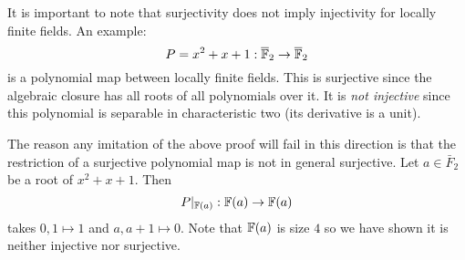 It is important to note that surjectivity does not imply
injectivity for locally finite fields.
An example:
\[ P = x^{2} + x + 1 : \overline{\mathbb{F}}_{2} \to \overline{\mathbb{F}}_{2}\]
is a polynomial map between locally finite fields.
This is surjective since the algebraic closure has all
roots of all polynomials over it.
It is \textit{not injective} since this polynomial is
separable in characteristic two (its derivative is a unit).

The reason any imitation of the above proof will fail
in this direction is that the restriction of a surjective polynomial map
is not in general surjective.
Let $a \in \bar{F}_{2}$ be a root of $x^{2} + x + 1$. Then
\[ P |_{\mathbb{F}(a)} : \mathbb{F}(a) \to \mathbb{F}(a) \]
takes $0,1 \mapsto 1$ and $a, a + 1 \mapsto 0$.
Note that $\mathbb{F}(a)$ is size $4$ so we have shown it is
neither injective nor surjective.
